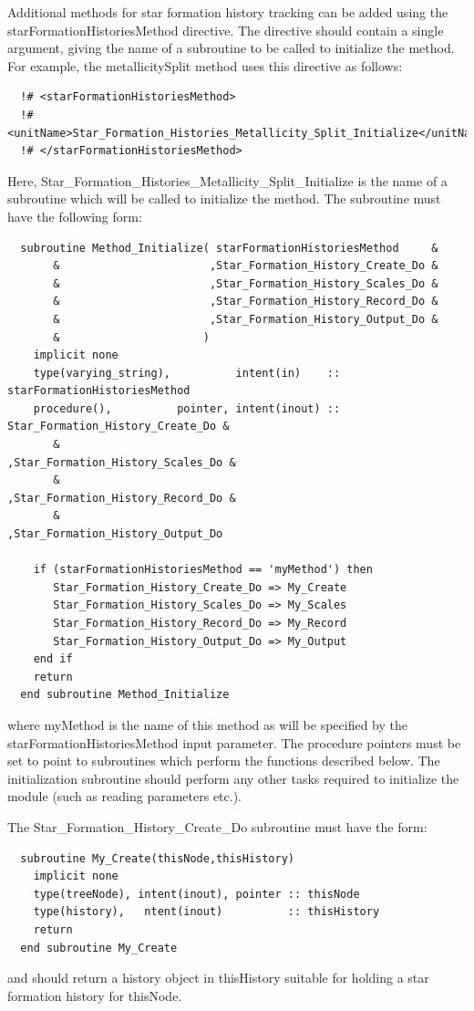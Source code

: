 Additional methods for star formation history tracking  can be added using the {\normalfont \ttfamily starFormationHistoriesMethod} directive. The directive should contain a single argument, giving the name of a subroutine to be called to initialize the method. For example, the {\normalfont \ttfamily metallicitySplit} method uses this directive as follows:
\begin{verbatim}
  !# <starFormationHistoriesMethod>
  !#  <unitName>Star_Formation_Histories_Metallicity_Split_Initialize</unitName>
  !# </starFormationHistoriesMethod>
\end{verbatim}
Here, {\normalfont \ttfamily Star\_Formation\_Histories\_Metallicity\_Split\_Initialize} is the name of a subroutine which will be called to initialize the method. The subroutine must have the following form:
\begin{verbatim}
  subroutine Method_Initialize( starFormationHistoriesMethod     &
       &                       ,Star_Formation_History_Create_Do &
       &                       ,Star_Formation_History_Scales_Do &
       &                       ,Star_Formation_History_Record_Do &
       &                       ,Star_Formation_History_Output_Do &
       &                      )
    implicit none
    type(varying_string),          intent(in)    ::  starFormationHistoriesMethod
    procedure(),          pointer, intent(inout) ::  Star_Formation_History_Create_Do &
       &                                            ,Star_Formation_History_Scales_Do &
       &                                            ,Star_Formation_History_Record_Do &
       &                                            ,Star_Formation_History_Output_Do
    
    if (starFormationHistoriesMethod == 'myMethod') then
       Star_Formation_History_Create_Do => My_Create
       Star_Formation_History_Scales_Do => My_Scales
       Star_Formation_History_Record_Do => My_Record
       Star_Formation_History_Output_Do => My_Output
    end if
    return
  end subroutine Method_Initialize
\end{verbatim}
where {\normalfont \ttfamily myMethod} is the name of this method as will be specified by the {\normalfont \ttfamily starFormationHistoriesMethod} input parameter. The procedure pointers must be set to point to subroutines which perform the functions described below. The initialization subroutine should perform any other tasks required to initialize the module (such as reading parameters etc.).

The {\normalfont \ttfamily Star\_Formation\_History\_Create\_Do} subroutine must have the form:
\begin{verbatim}
  subroutine My_Create(thisNode,thisHistory)
    implicit none
    type(treeNode), intent(inout), pointer :: thisNode
    type(history),   ntent(inout)          :: thisHistory
    return
  end subroutine My_Create
\end{verbatim}
and should return a history object in {\normalfont \ttfamily thisHistory} suitable for holding a star formation history for {\normalfont \ttfamily thisNode}.

